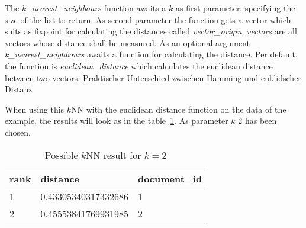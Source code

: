 The \textit{k\_nearest\_neighbours} function awaits a $k$ as first parameter, specifying the size of the list to return.
As second parameter the function gets a vector which suits as fixpoint for calculating the distances called \textit{vector\_origin}.
\textit{vectors} are all vectors whose distance shall be measured.
As an optional argument \textit{k\_nearest\_neighbours} awaits a function for calculating the distance.
Per default, the function is \textit{euclidean\_distance} which calculates the euclidean distance between two vectors.
{\color{red}Praktischer Unterschied zwischen Hamming und euklidscher Distanz}

When using this $k$NN with the euclidean distance function on the data of the example, the results will look as in the table~\ref{tab:knn-result}.
As parameter $k$ 2 has been chosen.



\begin{table}
    \center
    \begin{tabular}{ l | l | l }
        \rowcolor{\dustRowHead}
        rank    & distance              & document\_id\\\hline
        1       & 0.43305340317332686   & 1\\
        2       & 0.45553841769931985   & 2\\
    \end{tabular}
    \caption{Possible $k$NN result for $k=2$}
    \label{tab:knn-result}
\end{table}
